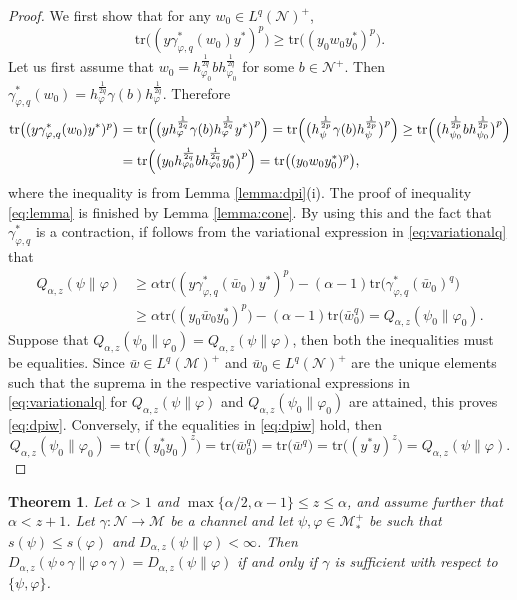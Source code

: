 \documentclass[12pt]{article}
\newtheorem{theorem}{Theorem}[section]
\theoremstyle{definition}
\theoremstyle{remark}
\numberwithin{equation}{section}
\def\Me{\mathcal M}
\def\Ne{\mathcal N}
\def\Tr{\mathrm{tr}}
\def\ffi{\varphi}
\begin{document}
\begin{proof} We first show that  for any $w_0\in L^q(\Ne)^+$,
\begin{equation}\label{eq:lemma}
\Tr\bigl((y\gamma^*_{\ffi,q}(w_0)y^*)^p\bigr)\ge
\Tr\bigl((y_0w_0y_0^*)^p\bigr).
\end{equation}
Let us first assume that
$w_0=h_{\varphi_0}^{\frac1{2q}}bh_{\varphi_0}^{\frac1{2q}}$ for some $b\in \Ne^+$. Then 
$\gamma^*_{\varphi,q}(w_0)=h_{\varphi}^{\frac1{2q}}\gamma(b)h_{\varphi}^{\frac1{2q}}$.
Therefore
\begin{align*}
\Tr\bigl((y\gamma^*_{\varphi,q}(w_0)y^*)^p\bigr)
&=\Tr\Bigl(\bigl(yh_{\varphi}^{\frac1{2q}}\gamma(b)h_{\varphi}^{\frac1{2q}}y^*\bigr)^p\Bigr)=
\Tr\Bigl(\bigl(h_\psi^{\frac1{2p}}\gamma(b)h_\psi^{\frac1{2p}}\bigr)^p\Bigr)\ge
\Tr\Bigl(\bigl(h_{\psi_0}^{\frac1{2p}}bh_{\psi_0}^{\frac1{2p}}\bigr)^p\Bigr)\\
&=\Tr\Bigl(\bigl(y_0h_{\varphi_0}^{\frac1{2q}}bh_{\varphi_0}^{\frac1{2q}}y_0^*\bigr)^p\Bigr)
=\Tr\bigl((y_0w_0y_0^*)^p\bigr),
\end{align*}
where the inequality is from Lemma \ref{lemma:dpi}(i). The proof of inequality
\eqref{eq:lemma} is  finished  by Lemma \ref{lemma:cone}.
By using this and the fact that $\gamma^*_{\ffi,q}$ is a contraction, if follows from the variational
expression in \eqref{eq:variationalq} that
\begin{align*}
Q_{\alpha,z}(\psi\|\varphi)
&\ge \alpha\Tr\bigl((y\gamma^*_{\varphi,q}(\bar w_0)y^*)^p\bigr)-
(\alpha-1)\Tr\bigl(\gamma^*_{\varphi,q}(\bar w_0)^q\bigr)\\
&\ge \alpha\Tr\bigr((y_0\bar w_0 y_0^*)^p\bigr)-(\alpha-1)\Tr\bigl(\bar
w_0^q\bigr)=Q_{\alpha,z}(\psi_0\|\varphi_0).
\end{align*}
Suppose that $Q_{\alpha,z}(\psi_0\|\varphi_0)=Q_{\alpha,z}(\psi\|\varphi)$, then both the
inequalities must be equalities. Since $\bar
w\in L^q(\Me)^+$ and $\bar w_0\in L^q(\Ne)^+$ are the unique elements such that the suprema
in the respective variational expressions in \eqref{eq:variationalq} for
$Q_{\alpha,z}(\psi\|\varphi)$ and $Q_{\alpha,z}(\psi_0\|\varphi_0)$ are attained, this proves
\eqref{eq:dpiw}. Conversely, if the equalities in \eqref{eq:dpiw} hold, then
\[
Q_{\alpha,z}(\psi_0\|\ffi_0)=\Tr\bigl((y_0^*y_0)^z\bigr)=\Tr\bigl(\bar w_0^q\bigr)
=\Tr\bigl(\bar w^q\bigr)=\Tr\bigl((y^*y)^z\bigr)=Q_{\alpha,z}(\psi\|\ffi).
\]
\end{proof}


\begin{theorem}\label{thm:suffge1}
{Let $\alpha>1$ and $\max\{\alpha/2,\alpha-1\}\le z\le\alpha$, and assume further that
$\alpha<z+1$.} Let $\gamma:\Ne\to \Me$ be a channel and let $\psi,\varphi\in \Me_*^+$ be such that 
$s(\psi)\le s(\ffi)$ and $D_{\alpha,z}(\psi\|\varphi)<\infty$. Then
$D_{\alpha,z}(\psi\circ\gamma\|\ffi\circ\gamma)=D_{\alpha,z}(\psi\|\varphi)$ if and only if
$\gamma$ is sufficient with respect to $\{\psi,\ffi\}$.
\end{theorem}
\end{document}
